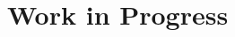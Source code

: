 \documentclass[a4paper,10pt]{article}
\begin{document}


\section{Work in Progress}

\begin{itemize}

\begin{comment}

\item Digital Technology and the Allocation of Ownership in the Music Industry

\begin{itemize}
\item Halonen-Akatwijuka, Maija and Regner, Tobias
\item Google Scholar cites: 17
\item Abstract: \tiny We apply the property rights theory of Grossman-Hart-Moore in the music industry and study the optimal allocation of copyright between the artists who create music and the labels who promote and distribute it. Digital technology opens up a role for new intermediaries. We find that entry of online distribution businesses occurs only if they are sufficiently more productive in distribution than the incumbent label. Furthermore, entry leads to a change in bargaining positions and it can become optimal for the copyright to be shifted from the label to the artist.
\end{itemize}



\item Motivational Cherry Picking: Social Context and Moral Decisions


\end{comment}
\end{itemize}
\end{document}

